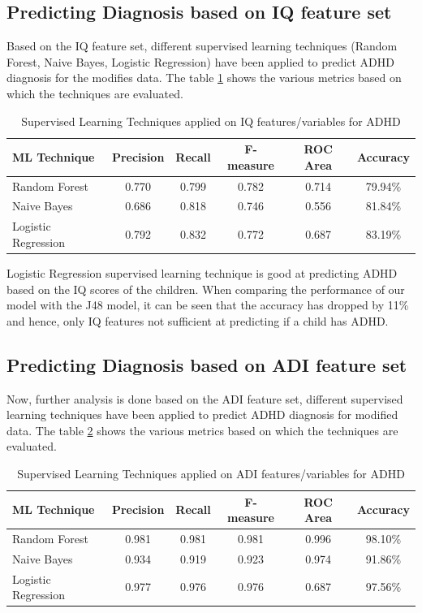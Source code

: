 \subsection{Predicting Diagnosis based on IQ feature set}
Based on the IQ feature set, different supervised learning techniques (Random Forest, Naive Bayes, Logistic Regression) have been applied to predict ADHD diagnosis for the modifies data. The table \ref{table:69} shows the various metrics based on which the techniques are evaluated.
\begin{table}[h]
\begin{center}
\begin{tabular}{|l|c|c|c|c|c|}
\hline
\textbf{ML Technique}&	\textbf{Precision}&	\textbf{Recall}&	\textbf{F-measure}&	\textbf{ROC Area}&	\textbf{Accuracy}\\
\hline \hline
Random Forest&0.770&	0.799&	0.782&	0.714&	79.94\%\\
\hline
Naive Bayes&0.686	&0.818&	0.746	&0.556&	81.84\%\\
\hline
Logistic Regression	&0.792&	0.832&	0.772&	0.687&	83.19\%\\
\hline
\end{tabular}
\end{center}
\caption{Supervised Learning Techniques applied on IQ features/variables for ADHD  }
\label{table:69}
\end{table}

Logistic Regression supervised learning technique is good at predicting ADHD based on the IQ scores of the children. When comparing the performance of our model with the J48 model, it can be seen that the accuracy has dropped by 11\% and hence, only IQ features not sufficient at predicting if a child has ADHD.

\subsection{Predicting Diagnosis based on ADI feature set}
Now, further analysis is done based on the ADI feature set, different supervised learning techniques have been applied to predict ADHD diagnosis for modified data. The table \ref{table:610} shows the various metrics based on which the techniques are evaluated.
\begin{table}[h]
\begin{center}
\begin{tabular}{|l|c|c|c|c|c|}
\hline
\textbf{ML Technique}&	\textbf{Precision}&	\textbf{Recall}&	\textbf{F-measure}&	\textbf{ROC Area}&	\textbf{Accuracy}\\
\hline \hline
Random Forest&0.981	&0.981	&0.981&	0.996	&98.10\%\\
\hline
Naive Bayes&0.934	&0.919&	0.923	&0.974	&91.86\%\\
\hline
Logistic Regression	&0.977&	0.976&	0.976&	0.687&	97.56\%\\
\hline
\end{tabular}
\end{center}
\caption{Supervised Learning Techniques applied on ADI features/variables for ADHD }
\label{table:610}
\end{table}

